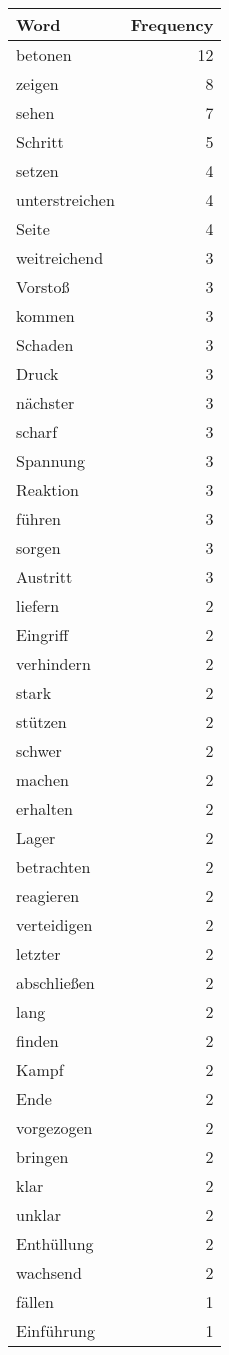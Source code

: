 \begin{tabular}{lr}
\toprule
Word & Frequency \\
\midrule
betonen & 12 \\
zeigen & 8 \\
sehen & 7 \\
Schritt & 5 \\
setzen & 4 \\
unterstreichen & 4 \\
Seite & 4 \\
weitreichend & 3 \\
Vorstoß & 3 \\
kommen & 3 \\
Schaden & 3 \\
Druck & 3 \\
nächster & 3 \\
scharf & 3 \\
Spannung & 3 \\
Reaktion & 3 \\
führen & 3 \\
sorgen & 3 \\
Austritt & 3 \\
liefern & 2 \\
Eingriff & 2 \\
verhindern & 2 \\
stark & 2 \\
stützen & 2 \\
schwer & 2 \\
machen & 2 \\
erhalten & 2 \\
Lager & 2 \\
betrachten & 2 \\
reagieren & 2 \\
verteidigen & 2 \\
letzter & 2 \\
abschließen & 2 \\
lang & 2 \\
finden & 2 \\
Kampf & 2 \\
Ende & 2 \\
vorgezogen & 2 \\
bringen & 2 \\
klar & 2 \\
unklar & 2 \\
Enthüllung & 2 \\
wachsend & 2 \\
fällen & 1 \\
Einführung & 1 \\

\end{tabular}
